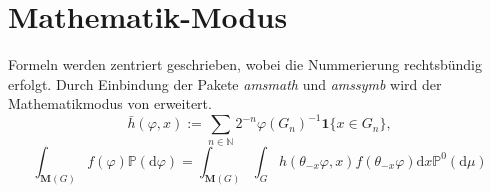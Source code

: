 \section{Mathematik-Modus}
Formeln werden zentriert geschrieben, wobei die Nummerierung rechtsbündig erfolgt. Durch Einbindung der Pakete \emph{amsmath} und \emph{amssymb} wird der Mathematikmodus von \LaTeXe{} erweitert. 
\begin{equation} 
	\bar{h}(\varphi,x) := \sum_{n\in\mathbb{N}} 2^{-n} \varphi(G_n)^{-1}\mathbf{1}\lbrace x\in G_n \rbrace,
\end{equation}
\begin{equation} 
	\int_{\mathbf{M}(G)}f(\varphi)\mathbb{P}(\mathrm{d}\varphi)=\int_{\mathbf{M}(G)}\int_G h(\theta_{-x}\varphi,x)f(\theta_{-x}\varphi)\mathrm{d}x\mathbb{P}^0(\mathrm{d}\mu)
\end{equation}